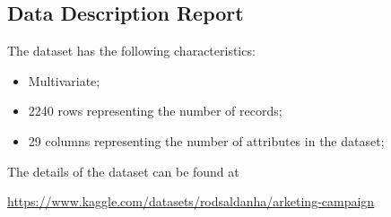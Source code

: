 \subsection{Data Description Report}

The dataset has the following characteristics: 
\begin{itemize}
    \item Multivariate;
    \item 2240 rows representing the number of records;
    \item 29 columns representing the number of attributes in the dataset;
\end{itemize}

The details of the dataset can be found at   

\href{kaggle}{https://www.kaggle.com/datasets/rodsaldanha/arketing-campaign}

